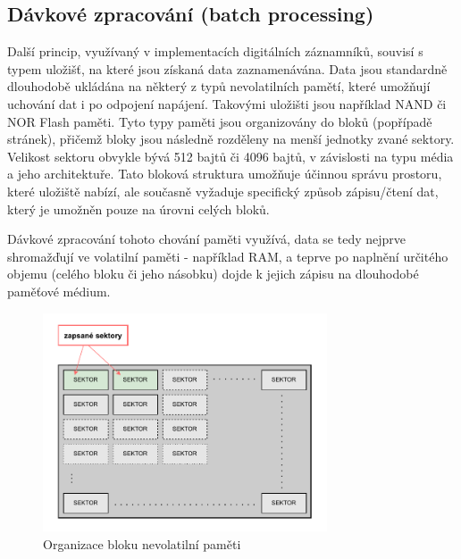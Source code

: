 \subsection{Dávkové zpracování (batch processing)}
\label{davkove_zpracovani}
Další princip, využívaný v implementacích digitálních záznamníků, souvisí s typem uložišť, na které jsou získaná data zaznamenávána. Data jsou standardně dlouhodobě ukládána na některý z typů nevolatilních pamětí, které umožňují uchování dat i po odpojení napájení. Takovými uložišti jsou například NAND či NOR Flash paměti. Tyto typy paměti jsou organizovány do bloků (popřípadě stránek), přičemž bloky jsou následně rozděleny na menší jednotky zvané sektory. Velikost sektoru obvykle bývá 512 bajtů či 4096 bajtů, v závislosti na typu média a jeho architektuře. Tato bloková struktura umožňuje účinnou správu prostoru, které uložiště nabízí, ale současně vyžaduje specifický způsob zápisu/čtení dat, který je umožněn pouze na úrovni celých bloků. \cite{tech_target_nand_flash, non_volatile_memories}

Dávkové zpracování tohoto chování paměti využívá, data se tedy nejprve shromažďují ve volatilní paměti - například RAM, a teprve po naplnění určitého objemu (celého bloku či jeho násobku) dojde k jejich zápisu na dlouhodobé paměťové médium.

\begin{figure}[h]
    \centering
    \includegraphics[width=0.75\textwidth]{obrazky-figures/batch_processing.pdf}
    
    \caption{Organizace bloku nevolatilní paměti \cite{ieee_relationships_among_region_segment_frame_and_cluster}}
    \label{fig:batch-processing}
\end{figure}

\newpage

